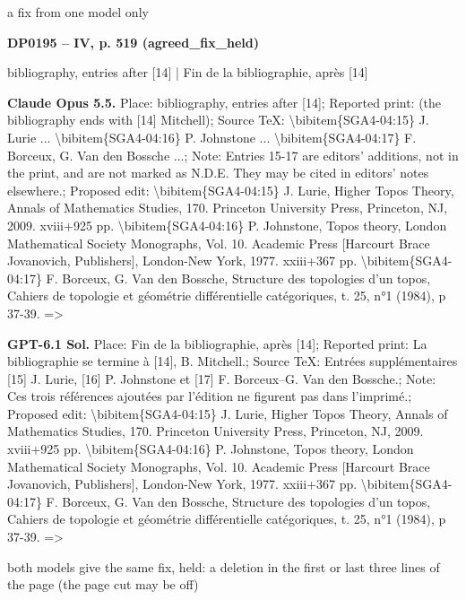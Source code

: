 a fix from one model only\par
\par\noindent\hypertarget{DP0195}{}\textbf{DP0195 -- IV, p. 519 (agreed\_fix\_held)}\par
bibliography, entries after [14] | Fin de la bibliographie, après [14]\par
\textbf{Claude Opus 5.5.} Place: bibliography, entries after [14]; Reported print: (the bibliography ends with [14] Mitchell); Source TeX: \textbackslash{}bibitem\{SGA4-04:15\} J. Lurie ... \textbackslash{}bibitem\{SGA4-04:16\} P. Johnstone ... \textbackslash{}bibitem\{SGA4-04:17\} F. Borceux, G. Van den Bossche ...; Note: Entries 15-17 are editors' additions, not in the print, and are not marked as N.D.E. They may be cited in editors' notes elsewhere.; Proposed edit: \textbackslash{}bibitem\{SGA4-04:15\} J. Lurie, Higher Topos Theory, Annals of Mathematics Studies, 170. Princeton University Press,  Princeton, NJ, 2009. xviii+925 pp.  \textbackslash{}bibitem\{SGA4-04:16\}  P. Johnstone, Topos theory,  London Mathematical Society Monographs, Vol. 10.  Academic Press [Harcourt Brace Jovanovich, Publishers], London-New York, 1977. xxiii+367 pp.  \textbackslash{}bibitem\{SGA4-04:17\} F. Borceux, G. Van den Bossche, Structure des topologies d'un topos, Cahiers de topologie et géométrie différentielle catégoriques, t. 25, n°1 (1984), p 37-39.  =\allowbreak > \par
\textbf{GPT-6.1 Sol.} Place: Fin de la bibliographie, après [14]; Reported print: La bibliographie se termine à [14], B. Mitchell.; Source TeX: Entrées supplémentaires [15] J. Lurie, [16] P. Johnstone et [17] F. Borceux–G. Van den Bossche.; Note: Ces trois références ajoutées par l'édition ne figurent pas dans l'imprimé.; Proposed edit: \textbackslash{}bibitem\{SGA4-04:15\} J. Lurie, Higher Topos Theory, Annals of Mathematics Studies, 170. Princeton University Press,  Princeton, NJ, 2009. xviii+925 pp.  \textbackslash{}bibitem\{SGA4-04:16\}  P. Johnstone, Topos theory,  London Mathematical Society Monographs, Vol. 10.  Academic Press [Harcourt Brace Jovanovich, Publishers], London-New York, 1977. xxiii+367 pp.  \textbackslash{}bibitem\{SGA4-04:17\} F. Borceux, G. Van den Bossche, Structure des topologies d'un topos, Cahiers de topologie et géométrie différentielle catégoriques, t. 25, n°1 (1984), p 37-39. =\allowbreak > \par
both models give the same fix, held: a deletion in the first or last three lines of the page (the page cut may be off)\par

